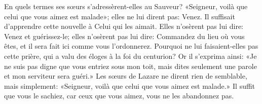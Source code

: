En quels termes ses sœurs s’adressèrent-elles au Sauveur?
	«Seigneur, voilà que celui que vous aimez est malade»;
	elles ne lui dirent pas: Venez.
Il suffisait d’apprendre cette nouvelle à Celui qui les aimait.
Elles n’osèrent pas lui dire: Venez et guérissez-le;
	elles n’osèrent pas lui dire: Commandez du lieu où vous êtes,
	et il sera fait ici comme vous l’ordonnerez.
Pourquoi ne lui faisaient-elles pas cette prière,
	qui a valu des éloges à la foi du centurion?
Or il s’exprima ainsi: «Je ne suis pas digne que vous entriez sous mon toit,
	mais dites seulement une parole et mon serviteur sera guéri.»
Les sœurs de Lazare ne dirent rien de semblable, mais simplement:
	«Seigneur, voilà que celui que vous aimez est malade.»
Il suffit que vous le sachiez,
	car ceux que vous aimez, vous ne les abandonnez pas.
